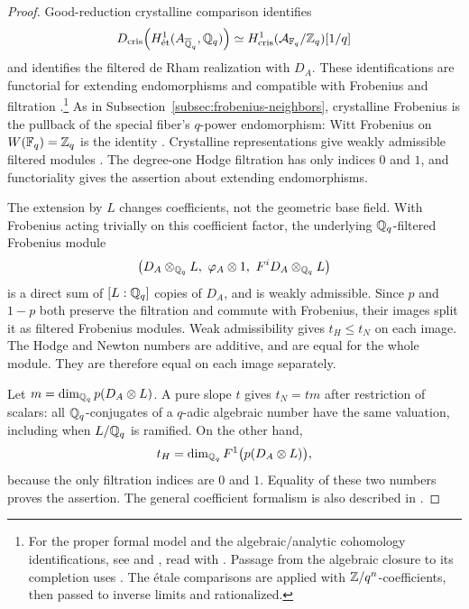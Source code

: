 \begin{proof}
Good-reduction crystalline comparison identifies
\[
D_{\mathrm{cris}}\!
 \left(H^1_{\mathrm{\acute et}}(A_{\overline{\mathbb{Q}}_q},\mathbb{Q}_q)\right)
\simeq
H^1_{\mathrm{cris}}(\mathcal A_{\mathbb{F}_q}/\mathbb{Z}_q)[1/q]
\]
and identifies the filtered de Rham realization with \(D_A\).
These identifications are functorial for extending endomorphisms and
compatible with Frobenius and filtration
\cite[Theorem~1.1(i), Theorem~12.1, and \S12.2]{BhattMorrowScholze2018}.\footnote{For the proper formal model and the algebraic/analytic
cohomology identifications, see \cite[\S7.2, p.~161]{Bosch2014FormalRigid}
and \cite[Theorems~9.1 and~9.3]{Scholze2013RigidAnalyticHodge}, read with
\cite{Scholze2016RigidAnalyticHodgeCorrigendum}. Passage from the algebraic
closure to its completion uses \cite[Tag~0DDG]{StacksProject}.
The \'etale comparisons are applied with \(\mathbb{Z}/q^n\)-coefficients,
then passed to inverse limits and rationalized.}
As in Subsection~\ref{subsec:frobenius-neighbors}, crystalline Frobenius is
the pullback of the special fiber's \(q\)-power endomorphism: Witt
Frobenius on \(W(\mathbb{F}_q)=\mathbb{Z}_q\) is the identity
\cite[Tags~07N3 and~07N5]{StacksProject}.
Crystalline representations give weakly admissible filtered modules
\cite[Theorem~9.3.4]{BrinonConrad2009}. The degree-one Hodge filtration
has only indices \(0\) and \(1\), and functoriality gives the assertion
about extending endomorphisms.

The extension by \(L\) changes coefficients, not the geometric base
field. With Frobenius acting trivially on this coefficient factor, the
underlying \(\mathbb{Q}_q\)-filtered Frobenius module
\[
\bigl(D_A\otimes_{\mathbb{Q}_q}L,\ \varphi_A\otimes1,\
       F^iD_A\otimes_{\mathbb{Q}_q}L\bigr)
\]
is a direct sum of \([L:\mathbb{Q}_q]\) copies of \(D_A\), and is weakly
admissible. Since \(p\) and \(1-p\) both preserve the filtration and
commute with Frobenius, their images split it as filtered Frobenius
modules. Weak admissibility gives \(t_H\leq t_N\) on each image.
The Hodge and Newton numbers are additive, and are equal for the whole
module. They are therefore equal on each image separately.

Let \(m=\dim_{\mathbb{Q}_q}p(D_A\otimes L)\). A pure slope \(t\) gives
\(t_N=tm\) after restriction of scalars: all \(\mathbb{Q}_q\)-conjugates of a
\(q\)-adic algebraic number have the same valuation, including when
\(L/\mathbb{Q}_q\) is ramified. On the other hand,
\[
t_H=\dim_{\mathbb{Q}_q}F^1\bigl(p(D_A\otimes L)\bigr),
\]
because the only filtration indices are \(0\) and \(1\). Equality of
these two numbers proves the assertion. The general coefficient
formalism is also described in
\cite[Proposition~2.17(ii) and Corollary~2.22]{Hellmann2011}.
\end{proof}

